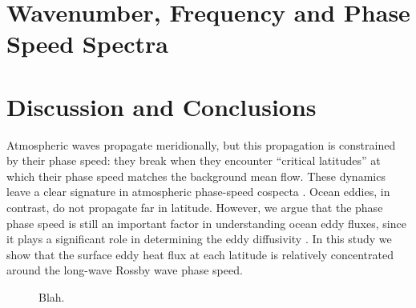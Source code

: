 \documentclass[10pt]{article}
\begin{document}
\section{Wavenumber, Frequency and Phase Speed Spectra}

\section{Discussion and Conclusions}
Atmospheric waves propagate meridionally, but this propagation is constrained by their phase speed: they break when they encounter ``critical latitudes'' at which their phase speed matches the background mean flow. These dynamics leave a clear signature in atmospheric phase-speed cospecta \citep{ChenHeld2007}. Ocean eddies, in contrast, do not propagate far in latitude. However, we argue that the phase phase speed is still an important factor in understanding ocean eddy fluxes, since it plays a significant role in determining the eddy diffusivity \citep{AbernatheyEtAl2010,FerrariNikurashin2010}. In this study we show that the surface eddy heat flux at each latitude is relatively concentrated around the long-wave Rossby wave phase speed.



\begin{figure}[t!]
  \noindent %
  \caption{Blah.}
  \label{fig:a}
\end{figure}

{}
{\clearpage}

{}
{\clearpage}


\end{document}
